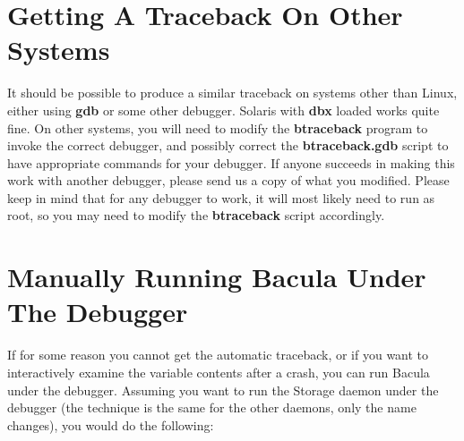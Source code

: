 \section{Getting A Traceback On Other Systems}

It should be possible to produce a similar traceback on systems other than
Linux, either using {\bf gdb} or some other debugger. Solaris with {\bf dbx}
loaded works quite fine. On other systems, you will need to modify the {\bf
btraceback} program to invoke the correct debugger, and possibly correct the
{\bf btraceback.gdb} script to have appropriate commands for your debugger. If
anyone succeeds in making this work with another debugger, please send us a
copy of what you modified. Please keep in mind that for any debugger to
work, it will most likely need to run as root, so you may need to modify
the {\bf btraceback} script accordingly.

\label{ManuallyDebugging}
\section{Manually Running Bacula Under The Debugger}

If for some reason you cannot get the automatic traceback, or if you want to
interactively examine the variable contents after a crash, you can run Bacula
under the debugger. Assuming you want to run the Storage daemon under the
debugger (the technique is the same for the other daemons, only the name
changes), you would do the following:

